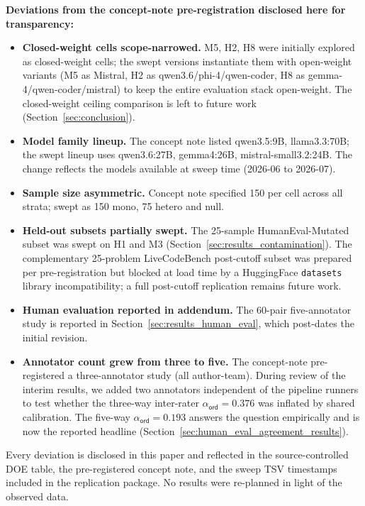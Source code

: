 \textbf{Deviations from the concept-note pre-registration disclosed here for transparency:}

\begin{itemize}
  \item \textbf{Closed-weight cells scope-narrowed.} M5, H2, H8 were initially explored as closed-weight cells; the swept versions instantiate them with open-weight variants (M5 as Mistral, H2 as qwen3.6/phi-4/qwen-coder, H8 as gemma-4/qwen-coder/mistral) to keep the entire evaluation stack open-weight. The closed-weight ceiling comparison is left to future work (Section~\ref{sec:conclusion}).
  \item \textbf{Model family lineup.} The concept note listed qwen3.5:9B, llama3.3:70B; the swept lineup uses qwen3.6:27B, gemma4:26B, mistral-small3.2:24B. The change reflects the models available at sweep time (2026-06 to 2026-07).
  \item \textbf{Sample size asymmetric.} Concept note specified 150 per cell across all strata; swept as 150 mono, 75 hetero and null.
  \item \textbf{Held-out subsets partially swept.} The 25-sample HumanEval-Mutated subset was swept on H1 and M3 (Section~\ref{sec:results_contamination}). The complementary 25-problem LiveCodeBench post-cutoff subset was prepared per pre-registration but blocked at load time by a HuggingFace \texttt{datasets} library incompatibility; a full post-cutoff replication remains future work.
  \item \textbf{Human evaluation reported in addendum.} The 60-pair five-annotator study is reported in Section~\ref{sec:results_human_eval}, which post-dates the initial revision.
  \item \textbf{Annotator count grew from three to five.} The concept-note pre-registered a three-annotator study (all author-team). During review of the interim results, we added two annotators independent of the pipeline runners to test whether the three-way inter-rater $\alpha_{\textsf{ord}} = 0.376$ was inflated by shared calibration. The five-way $\alpha_{\textsf{ord}} = 0.193$ answers the question empirically and is now the reported headline (Section~\ref{sec:human_eval_agreement_results}).
\end{itemize}

Every deviation is disclosed in this paper and reflected in the source-controlled DOE table, the pre-registered concept note, and the sweep TSV timestamps included in the replication package. No results were re-planned in light of the observed data.
